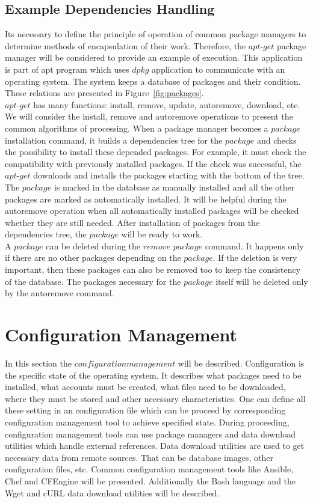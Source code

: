 \subsection*{Example Dependencies Handling}\label{subs:depapt}
Its necessary to define the principle of operation of common package managers to determine methods of encapsulation of their work.
Therefore, the $apt$-$get$ package manager will be considered to provide an example of execution.
This application is part of \gls{apt} program which uses $dpkg$ application to communicate with an operating system.
The system keeps a database of packages and their condition.
These relations are presented in Figure~\ref{fig:packages}.\\
$apt$-$get$ has many functions: install, remove, update, autoremove, download, etc.
We will consider the install, remove and autoremove operations to present the common algorithms of processing.
When a package manager becomes a $package$ installation command, it builds a dependencies tree for the $package$ and checks the possibility to install these depended packages.
For example, it must check the compatibility with previously installed packages. 
If the check was successful, the $apt$-$get$ downloads and installs the packages starting with the bottom of the tree.
The $package$ is marked in the database as manually installed and all the other packages are marked as automatically installed. 
It will be helpful during the autoremove operation when all automatically installed packages will be checked whether they are still needed.
After installation of packages from the dependencies tree, the $package$ will be ready to work.\\
A $package$ can be deleted during the $remove$ $package$ command.
It happens only if there are no other packages depending on the $package$. 
If the deletion is very important, then these packages can also be removed too to keep the consistency of the database. 
The packages necessary for the $package$ itself will be deleted only by the autoremove command.

\section{Configuration Management}\label{sec:confman}
In this section the $configuration management$ will be described. 
Configuration is the specific state of the operating system.
It describes what packages need to be installed, what accounts must be created, what files need to be downloaded, where they must be stored and other necessary characteristics.
One can define all these setting in an configuration file which can be proceed by corresponding configuration management tool to achieve specified state.
During proceeding, configuration management tools can use package managers and data download utilities which handle external references.
Data download utilities are used to get necessary data from remote sources.
That can be database images, other configuration files, etc.
Common configuration management tools like Ansible, Chef and CFEngine will be presented.
Additionally the Bash language and the Wget and cURL data download utilities will be described. 

